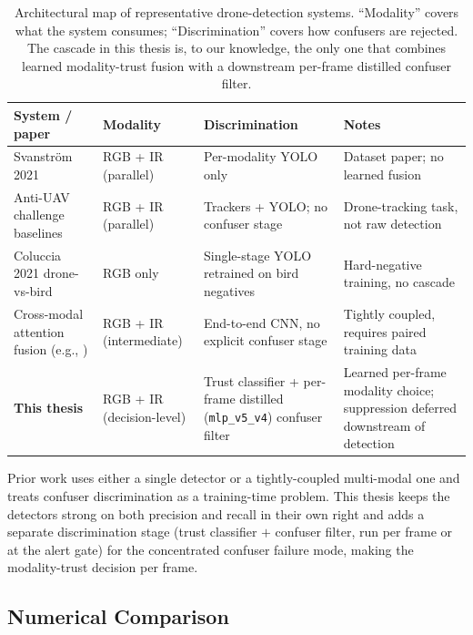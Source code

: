 \begin{table}[htbp]
    \centering
    \caption{Architectural map of representative drone-detection systems. ``Modality'' covers what the system consumes; ``Discrimination'' covers how confusers are rejected. The cascade in this thesis is, to our knowledge, the only one that combines learned modality-trust fusion with a downstream per-frame distilled confuser filter.}
    \label{tab:related_systems}
    \footnotesize
    \begin{tabular}{p{2.8cm}p{2.4cm}p{4.2cm}p{3.2cm}}
        \toprule
        System / paper & Modality & Discrimination & Notes \\
        \midrule
        Svanstr\"om 2021~\cite{svanstrom2021real} & RGB + IR (parallel) & Per-modality YOLO only & Dataset paper; no learned fusion \\
        Anti-UAV challenge baselines~\cite{jiang2021antiuav} & RGB + IR (parallel) & Trackers + YOLO; no confuser stage & Drone-tracking task, not raw detection \\
        Coluccia 2021 drone-vs-bird~\cite{coluccia2021dronevsbird} & RGB only & Single-stage YOLO retrained on bird negatives & Hard-negative training, no cascade \\
        Cross-modal attention fusion (e.g., \cite{wagner2016multispectral}) & RGB + IR (intermediate) & End-to-end CNN, no explicit confuser stage & Tightly coupled, requires paired training data \\
        \textbf{This thesis} & RGB + IR (decision-level) & Trust classifier + per-frame distilled (\texttt{mlp\_v5\_v4}) confuser filter & Learned per-frame modality choice; suppression deferred downstream of detection \\
        \bottomrule
    \end{tabular}
\end{table}

Prior work uses either a single detector or a tightly-coupled multi-modal one and treats confuser discrimination as a training-time problem. This thesis keeps the detectors strong on both precision and recall in their own right and adds a separate discrimination stage (trust classifier $+$ confuser filter, run per frame or at the alert gate) for the concentrated confuser failure mode, making the modality-trust decision per frame.

\subsection{Numerical Comparison}

